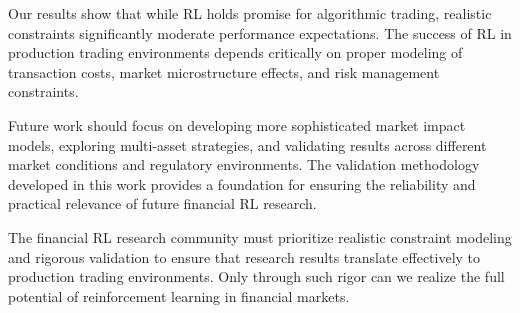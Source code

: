 \documentclass[11pt,a4paper]{article}
\begin{document}
Our results show that while RL holds promise for algorithmic trading, realistic constraints significantly moderate performance expectations. The success of RL in production trading environments depends critically on proper modeling of transaction costs, market microstructure effects, and risk management constraints.

Future work should focus on developing more sophisticated market impact models, exploring multi-asset strategies, and validating results across different market conditions and regulatory environments. The validation methodology developed in this work provides a foundation for ensuring the reliability and practical relevance of future financial RL research.

The financial RL research community must prioritize realistic constraint modeling and rigorous validation to ensure that research results translate effectively to production trading environments. Only through such rigor can we realize the full potential of reinforcement learning in financial markets.
\
\
\end{document}
